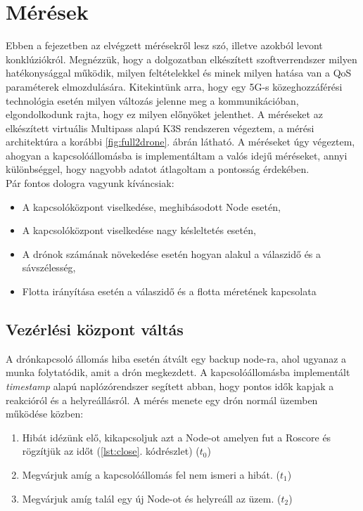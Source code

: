 \chapter{Mérések}

Ebben a fejezetben az elvégzett mérésekről lesz szó, illetve azokból levont konklúziókról. Megnézzük, hogy a dolgozatban elkészített szoftverrendszer milyen hatékonysággal működik, milyen feltételekkel és minek milyen hatása van a QoS paraméterek elmozdulására. Kitekintünk arra, hogy egy 5G-s közeghozzáférési technológia esetén milyen változás jelenne meg a kommunikációban, elgondolkodunk rajta, hogy ez milyen előnyöket jelenthet. A méréseket az elkészített virtuális Multipass alapú K3S rendszeren végeztem, a mérési architektúra a korábbi \ref{fig:full2drone}. ábrán látható. A méréseket úgy végeztem, ahogyan a kapcsolóállomásba is implementáltam a valós idejű méréseket, annyi különbséggel, hogy nagyobb adatot átlagoltam a pontosság érdekében. \\

\noindent
Pár fontos dologra vagyunk kíváncsiak:
\begin{itemize}
	\item A kapcsolóközpont viselkedése, meghibásodott Node esetén,
	\item A kapcsolóközpont viselkedése nagy késleltetés esetén,
	\item A drónok számának növekedése esetén hogyan alakul a válaszidő és a sávszélesség,
	\item Flotta irányítása esetén a válaszidő és a flotta méretének kapcsolata
\end{itemize}

\section{Vezérlési központ váltás}
A drónkapcsoló állomás hiba esetén átvált egy backup node-ra, ahol ugyanaz a munka folytatódik, amit a drón megkezdett. A kapcsolóállomásba implementált \emph{timestamp} alapú naplózórendszer segített abban, hogy pontos idők kapjak a reakcióról és a helyreállásról. A mérés menete egy drón normál üzemben működése közben:
\begin{enumerate}
	\item Hibát idézünk elő, kikapcsoljuk azt a Node-ot amelyen fut a Roscore és rögzítjük az időt (\ref{lst:close}. kódrészlet) ($t_0$)
	\item Megvárjuk amíg a kapcsolóállomás fel nem ismeri a hibát. ($t_1$)
	\item Megvárjuk amíg talál egy új Node-ot és helyreáll az üzem. ($t_2$)
\end{enumerate}

